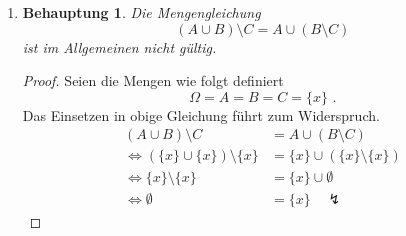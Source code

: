 \documentclass[a4paper]{scrartcl}
\newtheorem*{behaupt}{Behauptung}
\newcommand{\gdw}{\Leftrightarrow}
\begin{document}
\begin{enumerate}[label=\bfseries\arabic*.]
\begin{enumerate}[label=(\alph*)]
\begin{proof}
\begin{enumerate}
                        \item
                            $(A \setminus B) \cup (A \setminus C)
                            \supset A \setminus (B \cap C)$ \\
                            Da ausschließlich Äquivalenzumformungen vorgenommen
                            wurden, gilt obige Argumentation auch in der anderen
                            Richtung.
                    \end{enumerate}
                    Aus i. und ii. folgt die Behauptung.
                \end{proof}

            \item
                \begin{behaupt}
                    Die Mengengleichung
                    \begin{equation}
                        (A \cup B) \setminus C = A \cup (B \setminus C)
                    \end{equation}
                    ist im Allgemeinen nicht gültig.
                \end{behaupt}
                \begin{proof}
                    Seien die Mengen wie folgt definiert
                    \begin{equation}
                        \Omega = A = B = C = \{x\} \text{ .}
                    \end{equation}
                    Das Einsetzen in obige Gleichung führt zum Widerspruch.
                    \begin{equation}
                        \begin{split}
                        (A \cup B) \setminus C &= A \cup (B \setminus C) \\
                        \gdw (\{x\} \cup \{x\}) \setminus \{x\}
                        &= \{x\} \cup (\{x\} \setminus \{x\}) \\
                        \gdw \{x\} \setminus \{x\} &= \{x\} \cup \emptyset \\
                        \gdw \emptyset &= \{x\} \quad \lightning
                        \end{split}
                    \end{equation}
                \end{proof}

        \end{enumerate}


\end{enumerate}
\end{document}
